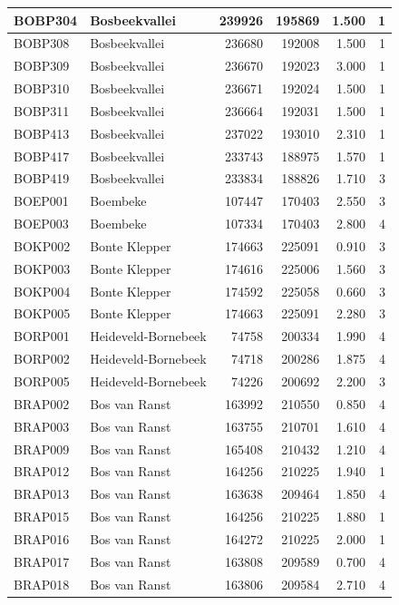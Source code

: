 \documentclass[11pt,]{book}
\begin{document}
\begin{table}
\begin{tabular}[t]{l|l|r|r|r|r}
\hline
BOBP304 & Bosbeekvallei & 239926 & 195869 & 1.500 & 1\\
\hline
BOBP308 & Bosbeekvallei & 236680 & 192008 & 1.500 & 1\\
\hline
BOBP309 & Bosbeekvallei & 236670 & 192023 & 3.000 & 1\\
\hline
BOBP310 & Bosbeekvallei & 236671 & 192024 & 1.500 & 1\\
\hline
BOBP311 & Bosbeekvallei & 236664 & 192031 & 1.500 & 1\\
\hline
BOBP413 & Bosbeekvallei & 237022 & 193010 & 2.310 & 1\\
\hline
BOBP417 & Bosbeekvallei & 233743 & 188975 & 1.570 & 1\\
\hline
BOBP419 & Bosbeekvallei & 233834 & 188826 & 1.710 & 3\\
\hline
BOEP001 & Boembeke & 107447 & 170403 & 2.550 & 3\\
\hline
BOEP003 & Boembeke & 107334 & 170403 & 2.800 & 4\\
\hline
BOKP002 & Bonte Klepper & 174663 & 225091 & 0.910 & 3\\
\hline
BOKP003 & Bonte Klepper & 174616 & 225006 & 1.560 & 3\\
\hline
BOKP004 & Bonte Klepper & 174592 & 225058 & 0.660 & 3\\
\hline
BOKP005 & Bonte Klepper & 174663 & 225091 & 2.280 & 3\\
\hline
BORP001 & Heideveld-Bornebeek & 74758 & 200334 & 1.990 & 4\\
\hline
BORP002 & Heideveld-Bornebeek & 74718 & 200286 & 1.875 & 4\\
\hline
BORP005 & Heideveld-Bornebeek & 74226 & 200692 & 2.200 & 3\\
\hline
BRAP002 & Bos van Ranst & 163992 & 210550 & 0.850 & 4\\
\hline
BRAP003 & Bos van Ranst & 163755 & 210701 & 1.610 & 4\\
\hline
BRAP009 & Bos van Ranst & 165408 & 210432 & 1.210 & 4\\
\hline
BRAP012 & Bos van Ranst & 164256 & 210225 & 1.940 & 1\\
\hline
BRAP013 & Bos van Ranst & 163638 & 209464 & 1.850 & 4\\
\hline
BRAP015 & Bos van Ranst & 164256 & 210225 & 1.880 & 1\\
\hline
BRAP016 & Bos van Ranst & 164272 & 210225 & 2.000 & 1\\
\hline
BRAP017 & Bos van Ranst & 163808 & 209589 & 0.700 & 4\\
\hline
BRAP018 & Bos van Ranst & 163806 & 209584 & 2.710 & 4\\

\end{tabular}
\end{table}
\end{document}
